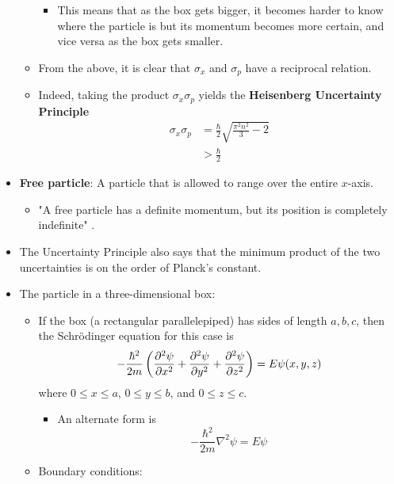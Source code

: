 \documentclass[../notes.tex]{subfiles}
\begin{document}
\begin{itemize}
\begin{itemize}
\begin{itemize}
            \item This means that as the box gets bigger, it becomes harder to know where the particle is but its momentum becomes more certain, and vice versa as the box gets smaller.
        \end{itemize}
        \item From the above, it is clear that $\sigma_x$ and $\sigma_p$ have a reciprocal relation.
        \item Indeed, taking the product $\sigma_x\sigma_p$ yields the \textbf{Heisenberg Uncertainty Principle}
        \begin{align*}
            \sigma_x\sigma_p &= \frac{\hbar}{2}\sqrt{\frac{\pi^2n^2}{3}-2}\\
            &> \frac{\hbar}{2}
        \end{align*}
    \end{itemize}
    \item \textbf{Free particle}: A particle that is allowed to range over the entire $x$-axis.
    \begin{itemize}
        \item "A free particle has a definite momentum, but its position is completely indefinite" \parencite[90]{bib:McQuarrieSimon}.
    \end{itemize}
    \item The Uncertainty Principle also says that the minimum product of the two uncertainties is on the order of Planck's constant.
    \item The particle in a three-dimensional box:
    \begin{itemize}
        \item If the box (a rectangular parallelepiped) has sides of length $a,b,c$, then the Schr\"{o}dinger equation for this case is
        \begin{equation*}
            -\frac{\hbar^2}{2m}\left( \pdv[2]{\psi}{x}+\pdv[2]{\psi}{y}+\pdv[2]{\psi}{z} \right) = E\psi(x,y,z)
        \end{equation*}
        where $0\leq x\leq a$, $0\leq y\leq b$, and $0\leq z\leq c$.
        \begin{itemize}
            \item An alternate form is
            \begin{equation*}
                -\frac{\hbar^2}{2m}\nabla^2\psi = E\psi
            \end{equation*}
        \end{itemize}
        \item Boundary conditions:

\end{itemize}
\end{itemize}
\end{document}
